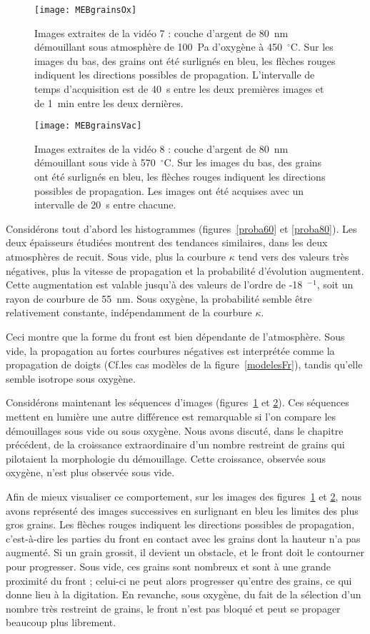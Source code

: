 \begin{figure}[!p]
\centering
\texttt{[image: MEBgrainsOx]}
\caption{Images extraites de la vidéo 7 : couche d’argent de 80~nm démouillant sous atmosphère de 100~Pa d’oxygène à 450~$^\circ$C. Sur les images du bas, des grains ont été surlignés en bleu, les flèches rouges indiquent les directions possibles de propagation. L'intervalle de temps d'acquisition est de 40~s entre les deux premières images et de 1~min entre les deux dernières.}
\label{MEBgrainsOx}
\end{figure}

\begin{figure}[!p]
\centering
\texttt{[image: MEBgrainsVac]}
\caption{Images extraites de la vidéo 8 : couche d’argent de 80~nm démouillant sous vide à 570~$^\circ$C. Sur les images du bas, des grains ont été surlignés en bleu, les flèches rouges indiquent les directions possibles de propagation. Les images ont été acquises avec un intervalle de 20~s entre chacune.}
\label{MEBgrainsVac}
\end{figure}
Considérons tout d'abord les histogrammes (figures~\ref{proba60} et \ref{proba80}). Les deux épaisseurs étudiées montrent des tendances similaires, dans les deux atmosphères de recuit. Sous vide, plus la courbure $\kappa$ tend vers des valeurs très négatives, plus la vitesse de propagation et la probabilité d’évolution augmentent. Cette augmentation est valable jusqu’à des valeurs de l’ordre de -18~\micro\meter$^{-1}$, soit un rayon de courbure de 55~nm. Sous oxygène, la probabilité semble être relativement constante, indépendamment de la courbure $\kappa$.\par 
Ceci montre que la forme du front est bien dépendante de l’atmosphère. Sous vide, la propagation au fortes courbures négatives est interprétée comme la propagation de doigts (Cf.les cas modèles de la figure~\ref{modelesFr}), tandis qu’elle semble isotrope sous oxygène.\par 
Considérons maintenant les séquences d'images (figures~\ref{MEBgrainsOx} et \ref{MEBgrainsVac}). Ces séquences mettent en lumière une autre différence est remarquable si l’on compare les démouillages sous vide ou sous oxygène. Nous avons discuté, dans le chapitre précédent, de la croissance extraordinaire d’un nombre restreint de grains qui pilotaient la morphologie du démouillage. Cette croissance, observée sous oxygène, n’est plus observée sous vide.\par
Afin de mieux visualiser ce comportement, sur les images des figures~\ref{MEBgrainsOx} et \ref{MEBgrainsVac}, nous avons représenté des images successives en surlignant en bleu les limites des plus gros grains. Les flèches rouges indiquent les directions possibles de propagation, c’est-à-dire les parties du front en contact avec les grains dont la hauteur n’a pas augmenté. Si un grain grossit, il devient un obstacle, et le front doit le contourner pour progresser. Sous vide, ces grains sont nombreux et sont à une grande proximité du front ; celui-ci ne peut alors progresser qu’entre des grains, ce qui donne lieu à la digitation. En revanche, sous oxygène, du fait de la sélection d’un nombre très restreint de grains, le front n’est pas bloqué et peut se propager beaucoup plus librement.\par 
